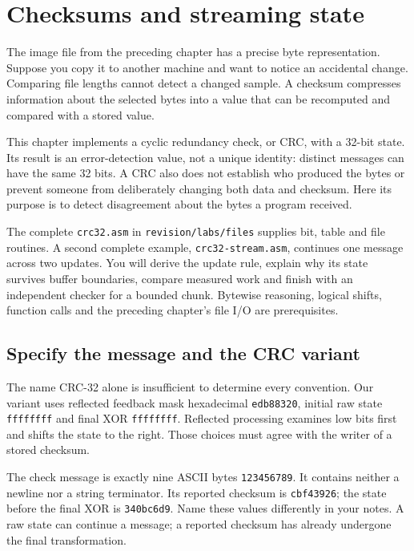 \chapter{Checksums and streaming state}
\label{revision:crc}

The image file from the preceding chapter has a precise byte representation.
Suppose you copy it to another machine and want to notice an accidental change.
Comparing file lengths cannot detect a changed sample. A checksum compresses
information about the selected bytes into a value that can be recomputed and
compared with a stored value.

This chapter implements a cyclic redundancy check, or CRC, with a 32-bit state.
Its result is an error-detection value, not a unique identity: distinct messages
can have the same 32 bits. A CRC also does not establish who produced the bytes
or prevent someone from deliberately changing both data and checksum. Here its
purpose is to detect disagreement about the bytes a program received.

The complete \texttt{crc32.asm} in \texttt{revision/labs/files} supplies bit,
table and file routines. A second complete example, \texttt{crc32-stream.asm},
continues one message across two updates. You will derive the update rule,
explain why its state survives buffer boundaries, compare measured work and
finish with an independent checker for a bounded chunk. Bytewise reasoning,
logical shifts, function calls and the preceding chapter's file I/O are prerequisites.

\section{Specify the message and the CRC variant}

The name CRC-32 alone is insufficient to determine every convention. Our variant
uses reflected feedback mask hexadecimal \texttt{edb88320}, initial raw state
\texttt{ffffffff} and final XOR \texttt{ffffffff}. Reflected processing examines
low bits first and shifts the state to the right. Those choices must agree with
the writer of a stored checksum.

The check message is exactly nine ASCII bytes \texttt{123456789}.
It contains neither a newline nor a string terminator. Its reported checksum is
\texttt{cbf43926}; the state before the final XOR is \texttt{340bc6d9}.
Name these values differently in your notes. A raw state can continue a message;
a reported checksum has already undergone the final transformation.

